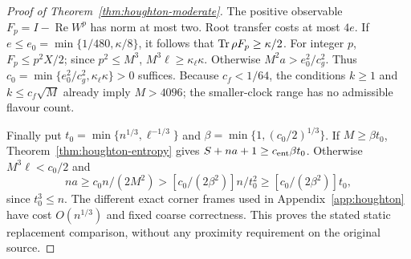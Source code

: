 \begin{proof}[Proof of Theorem~\ref{thm:houghton-moderate}]
The positive observable $F_p=I-\operatorname{Re}W^p$ has norm at
most two. Root transfer costs at most $4e$.
If $e\leq e_0=\min\{1/480,\kappa/8\}$, it follows that
$\operatorname{Tr}\rho F_p\geq\kappa/2$.
For integer $p$, $F_p\leq p^2X/2$; since $p^2\leq M^3$,
$M^3\ell\geq\kappa_\ell\kappa$.
Otherwise $M^2a>e_0^2/c_g^2$.
Thus $c_0=\min\{e_0^2/c_g^2,\kappa_\ell\kappa\}>0$ suffices.
Because $c_f<1/64$, the conditions $k\geq1$ and
$k\leq c_f\sqrt M$ already imply $M>4096$; the smaller-clock
range has no admissible flavour count.

Finally put $t_0=\min\{n^{1/3},\ell^{-1/3}\}$ and
$\beta=\min\{1,(c_0/2)^{1/3}\}$.
If $M\geq\beta t_0$, Theorem~\ref{thm:houghton-entropy} gives
$S+na+1\geq c_{\rm ent}\beta t_0$.
Otherwise $M^3\ell<c_0/2$ and
\[
 na\geq c_0n/(2M^2)>
             [c_0/(2\beta^2)]n/t_0^2
             \geq[c_0/(2\beta^2)]t_0,
\]
since $t_0^3\leq n$.
The different exact corner frames used in
Appendix~\ref{app:houghton} have cost $O(n^{1/3})$ and fixed
coarse correctness. This proves the stated static replacement
comparison, without any proximity requirement on the original source.
\end{proof}
